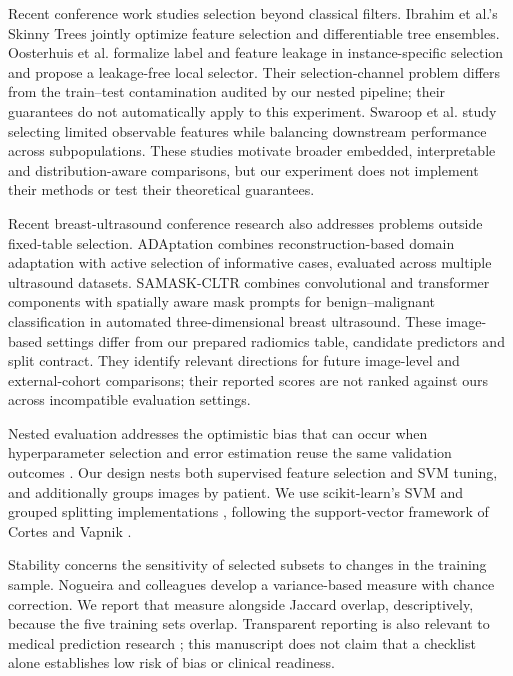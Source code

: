 \documentclass[11pt,a4paper]{article}
\begin{document}
Recent conference work studies selection beyond classical filters. Ibrahim et al.'s Skinny Trees \cite{skinnytrees} jointly optimize feature selection and differentiable tree ensembles. Oosterhuis et al. \cite{localleakage} formalize label and feature leakage in instance-specific selection and propose a leakage-free local selector. Their selection-channel problem differs from the train--test contamination audited by our nested pipeline; their guarantees do not automatically apply to this experiment. Swaroop et al. \cite{robustselection} study selecting limited observable features while balancing downstream performance across subpopulations. These studies motivate broader embedded, interpretable and distribution-aware comparisons, but our experiment does not implement their methods or test their theoretical guarantees.

Recent breast-ultrasound conference research also addresses problems outside fixed-table selection. ADAptation \cite{adaptation} combines reconstruction-based domain adaptation with active selection of informative cases, evaluated across multiple ultrasound datasets. SAMASK-CLTR \cite{samask} combines convolutional and transformer components with spatially aware mask prompts for benign--malignant classification in automated three-dimensional breast ultrasound. These image-based settings differ from our prepared radiomics table, candidate predictors and split contract. They identify relevant directions for future image-level and external-cohort comparisons; their reported scores are not ranked against ours across incompatible evaluation settings.

Nested evaluation addresses the optimistic bias that can occur when hyperparameter selection and error estimation reuse the same validation outcomes \cite{varma}. Our design nests both supervised feature selection and SVM tuning, and additionally groups images by patient. We use scikit-learn's SVM and grouped splitting implementations \cite{sklearn}, following the support-vector framework of Cortes and Vapnik \cite{svm}.

Stability concerns the sensitivity of selected subsets to changes in the training sample. Nogueira and colleagues \cite{nogueira} develop a variance-based measure with chance correction. We report that measure alongside Jaccard overlap, descriptively, because the five training sets overlap. Transparent reporting is also relevant to medical prediction research \cite{tripod}; this manuscript does not claim that a checklist alone establishes low risk of bias or clinical readiness.
\end{document}
